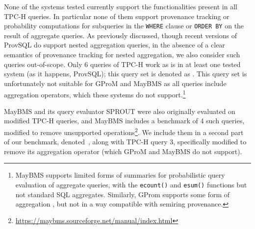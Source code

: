 None of the systems tested currently support the functionalities present
in all TPC-H queries. In particular none of them support provenance
tracking or probability computations for subqueries in
the \texttt{WHERE} clause or
\texttt{ORDER BY} on the result of aggregate queries. As
previously discussed, though recent versions of ProvSQL do support nested
aggregation queries, in the absence of a clear semantics of provenance
tracking for nested aggregation, we also consider such queries
out-of-scope. Only 6
queries of TPC-H work as is in at least one tested system (as it happens,
ProvSQL); this query set is denoted as \qtpc.
 This query set is
unfortunately not suitable for GProM and MayBMS as all queries include
aggregation operators, which these systems do not support.\footnote{MayBMS
	supports limited forms of summaries for probabilistic query evaluation of aggregate
	queries, with the \texttt{ecount()} and
	\texttt{esum()} functions but not standard SQL aggregates.
Similarly, GProm supports some form of aggregation
\cite{bahareh2018gprom}, but not in a way
compatible with semiring provenance.}

MayBMS and its query
evaluator SPROUT \cite{DBLP:conf/icde/OlteanuHK09} were also originally evaluated on
modified TPC-H queries, and MayBMS includes a benchmark of 4 such queries,
modified to remove unsupported operations\footnote{\url{https://maybms.sourceforge.net/manual/index.html}}. We
include them in a second part of our benchmark, denoted~\qtpce{}, along with TPC-H query 3, specifically modified to remove its aggregation operator (which
GProM and MayBMS do not support).

